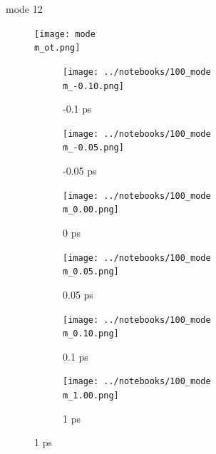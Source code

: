 \documentclass{beamer}
\begin{document}
\renewcommand\m{12}
\begin{frame}{mode \m}
		\vspace{\vh mm}
	\begin{figure}
		\centering
		\texttt{[image: mode\\m\_ot.png]}
	\end{figure}
	\begin{figure}
		\centering
		\begin{subfigure}[b]{\w\textwidth}
			\centering
			\texttt{[image: ../notebooks/100\_mode\\m\_-0.10.png]}
			\caption{-0.1 ps}
		\end{subfigure}
		\begin{subfigure}[b]{\w\textwidth}
			\centering
			\texttt{[image: ../notebooks/100\_mode\\m\_-0.05.png]}
			\caption{-0.05 ps}
		\end{subfigure}
		\begin{subfigure}[b]{\w\textwidth}
			\centering
			\texttt{[image: ../notebooks/100\_mode\\m\_0.00.png]}
			\caption{0 ps}
		\end{subfigure}
		\begin{subfigure}[b]{\w\textwidth}
			\centering
			\texttt{[image: ../notebooks/100\_mode\\m\_0.05.png]}
			\caption{0.05 ps}
		\end{subfigure}
		\begin{subfigure}[b]{\w\textwidth}
			\centering
			\texttt{[image: ../notebooks/100\_mode\\m\_0.10.png]}
			\caption{0.1 ps}
		\end{subfigure}
		\begin{subfigure}[b]{\w\textwidth}
			\centering
			\texttt{[image: ../notebooks/100\_mode\\m\_1.00.png]}
			\caption{1 ps}
		\end{subfigure}
	\end{figure}
\end{frame}
\end{document}
